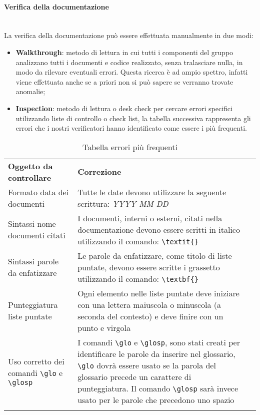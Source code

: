 \paragraph*{Verifica della documentazione} \mbox{} \\ [1mm] 
La verifica della documentazione può essere effettuata manualmente in due modi:
\begin{itemize}
	\item \textbf{Walkthrough}: metodo di lettura in cui tutti i componenti del gruppo analizzano tutti i documenti e codice realizzato, senza tralasciare nulla, in modo da rilevare eventuali errori. Questa ricerca è ad ampio spettro, infatti viene effettuata anche se a priori non si può sapere se verranno trovate anomalie;
	\item \textbf{Inspection}: metodo di lettura o desk check per cercare errori specifici utilizzando liste di controllo o check list, la tabella successiva rappresenta gli errori che i nostri verificatori hanno identificato come essere i più frequenti.
\end{itemize}
\setcounter{table}{0}
\begin{longtable} {
		>{}p{55mm} 
		>{}p{55mm}
		>{}p{0mm}}
	\rowcolor{gray!50}
	\textbf{Oggetto da controllare} & \textbf{Correzione} & \TBstrut \\[2mm]
	Formato data dei documenti & Tutte le date devono utilizzare la seguente scrittura: \textit{YYYY-MM-DD}  &  \TBstrut \\[2mm]
	Sintassi nome documenti citati & I documenti, interni o esterni, citati nella documentazione devono essere scritti in italico utilizzando il comando: \verb|\textit{}|  &  \TBstrut \\[2mm]
	Sintassi parole da enfatizzare & Le parole da enfatizzare, come titolo di liste puntate, devono essere scritte i grassetto utilizzando il comando: \verb|\textbf{}|  &  \TBstrut \\[2mm]
	Punteggiatura liste puntate & Ogni elemento nelle liste puntate deve iniziare con una lettera maiuscola o minuscola (a seconda del contesto) e deve finire con un punto e virgola &  \TBstrut \\[2mm]
	Uso corretto dei comandi \verb|\glo| e \verb|\glosp| & I comandi \verb|\glo| e \verb|\glosp|, sono stati creati per identificare le parole da inserire nel glossario, \verb|\glo| dovrà essere usato se la parola del glossario precede un carattere di punteggiatura. Il comando \verb|\glosp| sarà invece usato per le parole che precedono uno spazio &  \TBstrut \\	[2mm]
	\rowcolor{white}
	\caption{Tabella errori più frequenti}
\end{longtable}

